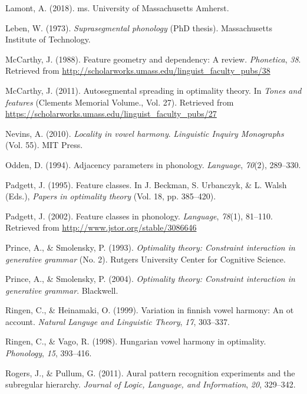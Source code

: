 \documentclass[,doc,floatsintext]{apa6}
\theoremstyle{definition}
\theoremstyle{definition}
\theoremstyle{definition}
\theoremstyle{remark}
\begin{document}
\hypertarget{ref-lamont2018}{}
Lamont, A. (2018). ms. University of Massachusetts Amherst.

\hypertarget{ref-leben1973}{}
Leben, W. (1973). \emph{Suprasegmental phonology} (PhD thesis).
Massachusetts Institute of Technology.

\hypertarget{ref-mccarthyfg1988}{}
McCarthy, J. (1988). Feature geometry and dependency: A review.
\emph{Phonetica}, \emph{38}. Retrieved from
\url{http://scholarworks.umass.edu/linguist_faculty_pubs/38}

\hypertarget{ref-mccarthy2011}{}
McCarthy, J. (2011). Autosegmental spreading in optimality theory. In
\emph{Tones and features} (Clements Memorial Volume., Vol. 27).
Retrieved from
\url{https://scholarworks.umass.edu/linguist_faculty_pubs/27}

\hypertarget{ref-Nevins2010}{}
Nevins, A. (2010). \emph{Locality in vowel harmony}. \emph{Linguistic
Inquiry Monographs} (Vol. 55). MIT Press.

\hypertarget{ref-odden1994}{}
Odden, D. (1994). Adjacency parameters in phonology. \emph{Language},
\emph{70}(2), 289--330.

\hypertarget{ref-padgett1995}{}
Padgett, J. (1995). Feature classes. In J. Beckman, S. Urbanczyk, \& L.
Walsh (Eds.), \emph{Papers in optimality theory} (Vol. 18, pp.
385--420).

\hypertarget{ref-padgett2002}{}
Padgett, J. (2002). Feature classes in phonology. \emph{Language},
\emph{78}(1), 81--110. Retrieved from
\url{http://www.jstor.org/stable/3086646}

\hypertarget{ref-princesmolensky1993}{}
Prince, A., \& Smolensky, P. (1993). \emph{Optimality theory: Constraint
interaction in generative grammar} (No. 2). Rutgers University Center
for Cognitive Science.

\hypertarget{ref-princesmolensky2004}{}
Prince, A., \& Smolensky, P. (2004). \emph{Optimality theory: Constraint
interaction in generative grammar}. Blackwell.

\hypertarget{ref-ringenheinamaki1999}{}
Ringen, C., \& Heinamaki, O. (1999). Variation in finnish vowel harmony:
An ot account. \emph{Natural Languge and Linguistic Theory}, \emph{17},
303--337.

\hypertarget{ref-ringenvago1998}{}
Ringen, C., \& Vago, R. (1998). Hungarian vowel harmony in optimality.
\emph{Phonology}, \emph{15}, 393--416.

\hypertarget{ref-rogerspullum2011}{}
Rogers, J., \& Pullum, G. (2011). Aural pattern recognition experiments
and the subregular hierarchy. \emph{Journal of Logic, Language, and
Information}, \emph{20}, 329--342.
\end{document}
